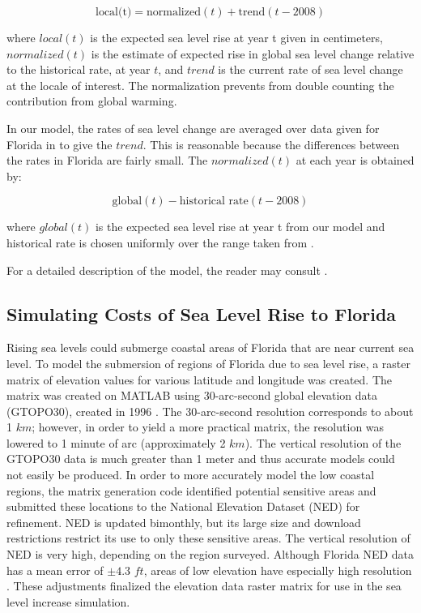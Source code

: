 \documentclass[12pt,a4paper,titlepage]{article}
\begin{document}
\[
\textrm{local(t)}=\textrm{normalized}(t)+\textrm{trend}(t-2008)
\]

where $local(t)$ is the expected sea level rise at year t given in
centimeters, $normalized(t)$ is the estimate of expected rise in
global sea level change relative to the historical rate, at year
$t$, and $trend$ is the current rate of sea level change at the
locale of interest. The normalization prevents from double
counting the contribution from global warming.

In our model, the rates of sea level change are averaged over data
given for Florida in to give the $trend$. This is reasonable
because the differences between the rates in Florida are fairly
small. The $normalized(t)$ at each year is obtained by:

\[
\textrm{global}(t)-\textrm{historical rate}(t-2008)
\]

where $global(t)$ is the expected sea level rise at year t from
our model and historical rate is chosen uniformly over the range
taken from .

For a detailed description of the model, the reader may consult .

\subsection{Simulating Costs of Sea Level Rise to Florida}

Rising sea levels could submerge coastal areas of Florida that are
near current sea level. To model the submersion of regions of
Florida due to sea level rise, a raster matrix of elevation values
for various latitude and longitude was created. The matrix was
created on MATLAB using 30-arc-second global elevation data
(GTOPO30), created in 1996 . The 30-arc-second resolution
corresponds to about 1 $km$; however, in order to yield a more
practical matrix, the resolution was lowered to 1 minute of arc
(approximately 2 $km$). The vertical resolution of the GTOPO30
data is much greater than 1 meter and thus accurate models could
not easily be produced. In order to more accurately model the low
coastal regions, the matrix generation code identified potential
sensitive areas and submitted these locations to the National
Elevation Dataset (NED) for refinement. NED is updated bimonthly,
but its large size and download restrictions restrict its use to
only these sensitive areas. The vertical resolution of NED is very
high, depending on the region surveyed. Although Florida NED data
has a mean error of $\pm4.3$ $ft$, areas of low elevation have
especially high resolution . These adjustments finalized the
elevation data raster matrix for use in the sea level increase
simulation.
\end{document}
